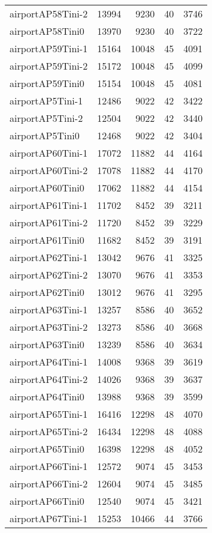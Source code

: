 \begin{longtable}{lrrrr}
airportAP58Tini-2 & 13994 & 9230 & 40 & 3746 \\
airportAP58Tini0 & 13970 & 9230 & 40 & 3722 \\
airportAP59Tini-1 & 15164 & 10048 & 45 & 4091 \\
airportAP59Tini-2 & 15172 & 10048 & 45 & 4099 \\
airportAP59Tini0 & 15154 & 10048 & 45 & 4081 \\
airportAP5Tini-1 & 12486 & 9022 & 42 & 3422 \\
airportAP5Tini-2 & 12504 & 9022 & 42 & 3440 \\
airportAP5Tini0 & 12468 & 9022 & 42 & 3404 \\
airportAP60Tini-1 & 17072 & 11882 & 44 & 4164 \\
airportAP60Tini-2 & 17078 & 11882 & 44 & 4170 \\
airportAP60Tini0 & 17062 & 11882 & 44 & 4154 \\
airportAP61Tini-1 & 11702 & 8452 & 39 & 3211 \\
airportAP61Tini-2 & 11720 & 8452 & 39 & 3229 \\
airportAP61Tini0 & 11682 & 8452 & 39 & 3191 \\
airportAP62Tini-1 & 13042 & 9676 & 41 & 3325 \\
airportAP62Tini-2 & 13070 & 9676 & 41 & 3353 \\
airportAP62Tini0 & 13012 & 9676 & 41 & 3295 \\
airportAP63Tini-1 & 13257 & 8586 & 40 & 3652 \\
airportAP63Tini-2 & 13273 & 8586 & 40 & 3668 \\
airportAP63Tini0 & 13239 & 8586 & 40 & 3634 \\
airportAP64Tini-1 & 14008 & 9368 & 39 & 3619 \\
airportAP64Tini-2 & 14026 & 9368 & 39 & 3637 \\
airportAP64Tini0 & 13988 & 9368 & 39 & 3599 \\
airportAP65Tini-1 & 16416 & 12298 & 48 & 4070 \\
airportAP65Tini-2 & 16434 & 12298 & 48 & 4088 \\
airportAP65Tini0 & 16398 & 12298 & 48 & 4052 \\
airportAP66Tini-1 & 12572 & 9074 & 45 & 3453 \\
airportAP66Tini-2 & 12604 & 9074 & 45 & 3485 \\
airportAP66Tini0 & 12540 & 9074 & 45 & 3421 \\
airportAP67Tini-1 & 15253 & 10466 & 44 & 3766 \\

\end{longtable}
